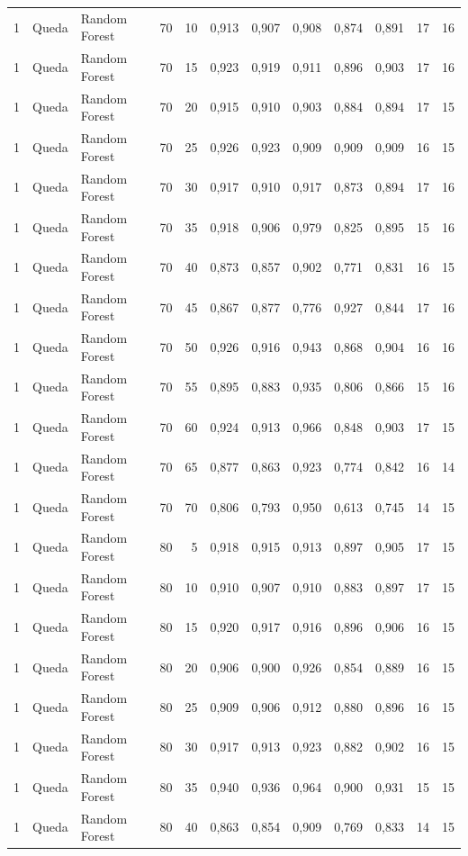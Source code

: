 \begin{longtable}{@{}rllrrrrrrrrr@{}}
1 & Queda & Random Forest & 70 & 10 & 0,913 & 0,907 & 0,908 & 0,874 & 0,891 & 17 & 16 \\
1 & Queda & Random Forest & 70 & 15 & 0,923 & 0,919 & 0,911 & 0,896 & 0,903 & 17 & 16 \\
1 & Queda & Random Forest & 70 & 20 & 0,915 & 0,910 & 0,903 & 0,884 & 0,894 & 17 & 15 \\
1 & Queda & Random Forest & 70 & 25 & 0,926 & 0,923 & 0,909 & 0,909 & 0,909 & 16 & 15 \\
1 & Queda & Random Forest & 70 & 30 & 0,917 & 0,910 & 0,917 & 0,873 & 0,894 & 17 & 16 \\
1 & Queda & Random Forest & 70 & 35 & 0,918 & 0,906 & 0,979 & 0,825 & 0,895 & 15 & 16 \\
1 & Queda & Random Forest & 70 & 40 & 0,873 & 0,857 & 0,902 & 0,771 & 0,831 & 16 & 15 \\
1 & Queda & Random Forest & 70 & 45 & 0,867 & 0,877 & 0,776 & 0,927 & 0,844 & 17 & 16 \\
1 & Queda & Random Forest & 70 & 50 & 0,926 & 0,916 & 0,943 & 0,868 & 0,904 & 16 & 16 \\
1 & Queda & Random Forest & 70 & 55 & 0,895 & 0,883 & 0,935 & 0,806 & 0,866 & 15 & 16 \\
1 & Queda & Random Forest & 70 & 60 & 0,924 & 0,913 & 0,966 & 0,848 & 0,903 & 17 & 15 \\
1 & Queda & Random Forest & 70 & 65 & 0,877 & 0,863 & 0,923 & 0,774 & 0,842 & 16 & 14 \\
1 & Queda & Random Forest & 70 & 70 & 0,806 & 0,793 & 0,950 & 0,613 & 0,745 & 14 & 15 \\
1 & Queda & Random Forest & 80 & 5 & 0,918 & 0,915 & 0,913 & 0,897 & 0,905 & 17 & 15 \\
1 & Queda & Random Forest & 80 & 10 & 0,910 & 0,907 & 0,910 & 0,883 & 0,897 & 17 & 15 \\
1 & Queda & Random Forest & 80 & 15 & 0,920 & 0,917 & 0,916 & 0,896 & 0,906 & 16 & 15 \\
1 & Queda & Random Forest & 80 & 20 & 0,906 & 0,900 & 0,926 & 0,854 & 0,889 & 16 & 15 \\
1 & Queda & Random Forest & 80 & 25 & 0,909 & 0,906 & 0,912 & 0,880 & 0,896 & 16 & 15 \\
1 & Queda & Random Forest & 80 & 30 & 0,917 & 0,913 & 0,923 & 0,882 & 0,902 & 16 & 15 \\
1 & Queda & Random Forest & 80 & 35 & 0,940 & 0,936 & 0,964 & 0,900 & 0,931 & 15 & 15 \\
1 & Queda & Random Forest & 80 & 40 & 0,863 & 0,854 & 0,909 & 0,769 & 0,833 & 14 & 15 \\

\end{longtable}
